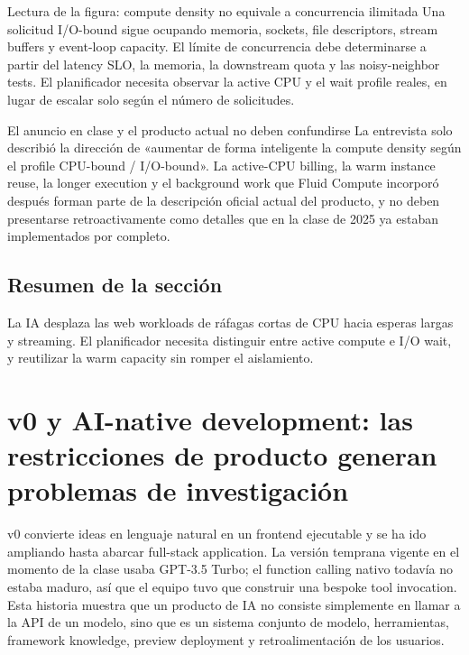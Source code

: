 \documentclass[a4paper]{article}
\begin{document}
\begin{knowledgebox}{Lectura de la figura: compute density no equivale a concurrencia ilimitada}
Una solicitud I/O-bound sigue ocupando memoria, sockets, file descriptors, stream buffers y event-loop capacity. El límite de concurrencia debe determinarse a partir del latency SLO, la memoria, la downstream quota y las noisy-neighbor tests. El planificador necesita observar la active CPU y el wait profile reales, en lugar de escalar solo según el número de solicitudes.
\end{knowledgebox}

\begin{warningbox}{El anuncio en clase y el producto actual no deben confundirse}
La entrevista solo describió la dirección de «aumentar de forma inteligente la compute density según el profile CPU-bound / I/O-bound». La active-CPU billing, la warm instance reuse, la longer execution y el background work que Fluid Compute incorporó después forman parte de la descripción oficial actual del producto, y no deben presentarse retroactivamente como detalles que en la clase de 2025 ya estaban implementados por completo.
\end{warningbox}


\subsection{Resumen de la sección}

La IA desplaza las web workloads de ráfagas cortas de CPU hacia esperas largas y streaming. El planificador necesita distinguir entre active compute e I/O wait, y reutilizar la warm capacity sin romper el aislamiento.
\section{v0 y AI-native development: las restricciones de producto generan problemas de investigación}

v0 convierte ideas en lenguaje natural en un frontend ejecutable y se ha ido ampliando hasta abarcar full-stack application. La versión temprana vigente en el momento de la clase usaba GPT-3.5 Turbo; el function calling nativo todavía no estaba maduro, así que el equipo tuvo que construir una bespoke tool invocation. Esta historia muestra que un producto de IA no consiste simplemente en llamar a la API de un modelo, sino que es un sistema conjunto de modelo, herramientas, framework knowledge, preview deployment y retroalimentación de los usuarios.
\end{document}
